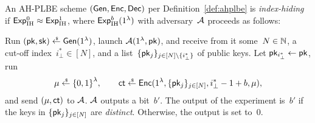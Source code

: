 \begin{definition}\label{def:ahplbe-index-hiding}
An AH-PLBE scheme $({\smash{\mathsf{Gen}}},{\smash{\mathsf{Enc}}},{\smash{\mathsf{Dec}}})$ per Definition~\ref{def:ahplbe}
is \emph{index-hiding} if ${{\smash{\mathsf{Exp}}_{\textup{IH}}^{0}}\approx{\smash{\mathsf{Exp}}_{\textup{IH}}^{1}}}$,
where ${\smash{\mathsf{Exp}}_{\textup{IH}}^{b}}(1^\lambda)$ with adversary~${\mathcal{A}}$ proceeds as follows:
\begin{security}
Run
${(\pk,\sk)\draws\Gen(1^\lambda)}$,
launch ${\mathcal{A}}(1^\lambda,{\smash{\mathsf{pk}}})$, and
receive from it
some~${N\in{\mathbb{N}}}$,
a cut-off index~${i_\bot^\ast\in[N]}$, and
a list~$\{\pk_j\}_{j\in[N]\setminus\{i_\bot^\ast\}}$ of public keys.
Let ${\pk_{i_\bot^\ast}\gets\pk}$,
run
\begin{align*}
\mu\draws\bit^\lambda,\qquad
\ct\draws\Enc(1^\lambda,\{\pk_j\}_{j\in[N]},i_\bot^\ast-1+b,\mu),
\end{align*}
and send $(\mu,{\smash{\mathsf{ct}}})$ to ${\mathcal{A}}$.
${\mathcal{A}}$ outputs a bit~$b'$.
The output of the experiment is~$b'$ if
the keys in $\{{\smash{\mathsf{pk}}}_j\}_{j\in[N]}$ are \emph{distinct}.
Otherwise, the output is set to~$0$.
\end{security}
\end{definition}
